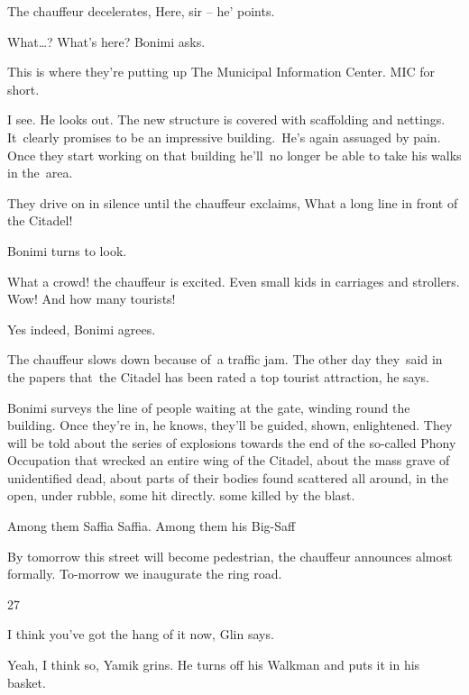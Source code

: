 \documentclass[twoside,11pt]{book}
\begin{document}
The chauffeur decelerates, {\textquotedbl}Here, sir --{\textquotedbl} he{}' points.

{\textquotedbl}What{\dots}? What's here?{\textquotedbl} Bonimi asks. 

{\textquotedbl}This is where they're putting up The Municipal Information Center. MIC for short.{\textquotedbl} 

{\textquotedbl}I see.{\textquotedbl} He looks out. The new structure is covered with scaffolding and nettings.
It{\ }clearly promises to be an impressive building.\ He{}'s again assuaged by pain. Once they start
working on that building he'll\ no longer be able to take his walks in the\ area. 

They drive on in silence until the chauffeur exclaims, {\textquotedbl}What a long line in front of the
Citadel!{\textquotedbl}

Bonimi turns to look. 

{\textquotedbl}What a crowd!{\textquotedbl} the chauffeur is excited. {\textquotedbl}Even small kids in carriages and
strollers. Wow! And how many tourists!{\textquotedbl}

{\textquotedbl}Yes indeed,{\textquotedbl} Bonimi agrees. 

The chauffeur slows down because of\ a traffic jam. {\textquotedbl}The other day they\ said in the papers that\ the
Citadel has been rated a top tourist attraction,{\textquotedbl} he says.

Bonimi surveys the line of people waiting at the gate, winding round the building. Once they're in, he knows, they'll be
guided, shown, enlightened. They will be told about the series of explosions towards the end of the so-called Phony
Occupation that wrecked an entire wing of the Citadel, about the mass grave of unidentified dead, about parts of their
bodies found scattered all around, in the open, under rubble, some hit directly. some killed by the blast.

Among them Saffia Saffia. Among them his Big-Saff

{\textquotedbl}By tomorrow this street will become pedestrian,{\textquotedbl} the chauffeur announces almost formally.
{\textquotedbl}To-morrow we inaugurate the ring road.{\textquotedbl} 


\bigskip

27 

{\textquotedbl}I think you've got the hang of it now,{\textquotedbl} Glin says.

{\textquotedbl}Yeah, I think so,{\textquotedbl} Yamik grins. He turns off his Walkman and puts it in his basket.
\end{document}
